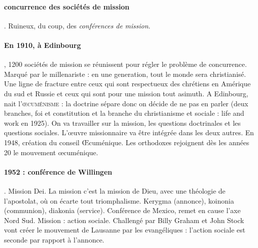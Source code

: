\paragraph{concurrence des sociétés de mission}. Ruineux, du coup, des \textit{conférences de mission}. 

\paragraph{En 1910, à Edinbourg}, 1200 sociétés de mission se réunissent pour régler le problème de  concurrence. Marqué par le millenariste : en une generation, tout le monde sera christianisé.
Une ligne de fracture entre ceux qui sont respectueux des chrétiens en Amérique du sud et Russie et ceux qui sont pour une mission tout asimuth.
A Edinbourg, nait l’\textsc{œcuménisme} : la doctrine sépare donc on décide de ne pas en parler (deux branches, foi et constitution et la branche du christianisme et sociale : life and work en 1925). On va travailler sur la mission, les questions doctrinales et les questions sociales.
L’œuvre missionnaire va être intégrée dans les deux autres. En 1948, création du conseil Œcuménique. Les orthodoxes rejoignent dès les années 20 le mouvement œcuménique. 

\paragraph{1952 : conférence de Willingen}. Mission Dei. La mission c’est la mission de Dieu, avec une théologie de l’apostolat, où on écarte tout triomphalisme. Kerygma (annonce), koinonia (communion), diakonia (service). Conférence de Mexico, remet en cause l’axe Nord Sud. Mission : action sociale. Challengé par Billy Graham et John Stock vont créer le mouvement de Lausanne par les evangéliques : l’action sociale est seconde par rapport à l’annonce. 

